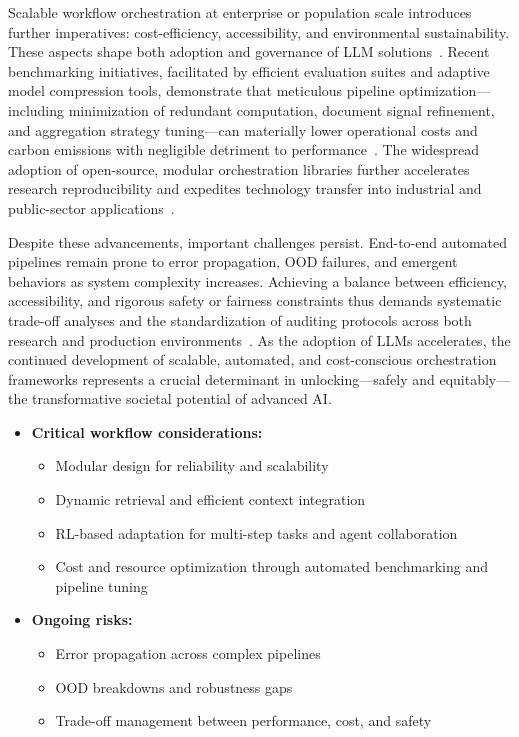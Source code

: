 Scalable workflow orchestration at enterprise or population scale introduces further imperatives: cost-efficiency, accessibility, and environmental sustainability. These aspects shape both adoption and governance of LLM solutions~\cite{ref37,ref43,ref55,ref88,ref104}. Recent benchmarking initiatives, facilitated by efficient evaluation suites and adaptive model compression tools, demonstrate that meticulous pipeline optimization—including minimization of redundant computation, document signal refinement, and aggregation strategy tuning—can materially lower operational costs and carbon emissions with negligible detriment to performance~\cite{ref43,ref55,ref88,ref104}. The widespread adoption of open-source, modular orchestration libraries further accelerates research reproducibility and expedites technology transfer into industrial and public-sector applications~\cite{ref37,ref43,ref79,ref86}.

Despite these advancements, important challenges persist. End-to-end automated pipelines remain prone to error propagation, OOD failures, and emergent behaviors as system complexity increases. Achieving a balance between efficiency, accessibility, and rigorous safety or fairness constraints thus demands systematic trade-off analyses and the standardization of auditing protocols across both research and production environments~\cite{ref8,ref43,ref80,ref104}. As the adoption of LLMs accelerates, the continued development of scalable, automated, and cost-conscious orchestration frameworks represents a crucial determinant in unlocking---safely and equitably---the transformative societal potential of advanced AI.

\begin{itemize}
    \item \textbf{Critical workflow considerations:}
        \begin{itemize}
            \item Modular design for reliability and scalability
            \item Dynamic retrieval and efficient context integration
            \item RL-based adaptation for multi-step tasks and agent collaboration
            \item Cost and resource optimization through automated benchmarking and pipeline tuning
        \end{itemize}
    \item \textbf{Ongoing risks:}
        \begin{itemize}
            \item Error propagation across complex pipelines
            \item OOD breakdowns and robustness gaps
            \item Trade-off management between performance, cost, and safety
        \end{itemize}
\end{itemize}

